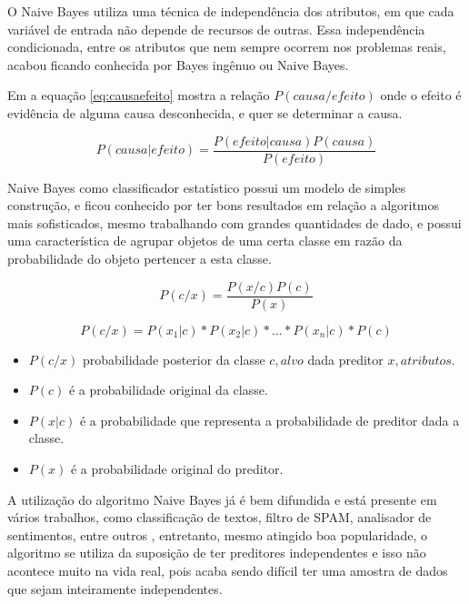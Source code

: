O Naive Bayes utiliza uma técnica de independência dos atributos, em que cada variável de entrada não depende de recursos de outras. Essa independência condicionada, entre os atributos que nem sempre ocorrem nos problemas reais, acabou ficando conhecida por Bayes ingênuo ou Naive Bayes. 

Em \cite{RusselStuart.Norvig2013} a equação \ref{eq:causaefeito} mostra a relação ${P(causa/efeito)}$ onde o efeito é evidência de alguma causa desconhecida, e quer se determinar a causa.

\begin{equation} \label{eq:causaefeito}
 P(causa|efeito)= \frac{P(efeito|causa)P(causa)}{P(efeito)}
\end{equation}

Naive Bayes como classificador estatístico possui um modelo de simples construção, e ficou conhecido por ter bons resultados em relação a algoritmos mais sofisticados, mesmo trabalhando com grandes quantidades de dado, e possui uma característica de agrupar objetos de uma certa classe em razão da probabilidade do objeto pertencer a esta classe. 

\begin{equation}
 P(c/x)= \frac{P(x/c)P(c)}{P(x)}
\end{equation}

\begin{equation}
 P(c/x)=P(x_1|c)*P(x_2|c)*...*P(x_n|c)*P(c)
 \label{eq:bayes}
\end{equation}


\begin{itemize}
 \item ${P(c/x)}$ probabilidade posterior da classe ${c,alvo}$ dada preditor ${x,atributos}$.
 \item ${P(c)}$  é a probabilidade original da classe.
 \item ${P(x|c)}$  é a probabilidade que representa a probabilidade de preditor dada a classe.
 \item ${P(x)}$  é a probabilidade original do preditor.
\end{itemize}

A utilização do algoritmo Naive Bayes já é bem difundida e está presente em vários trabalhos, como classificação de textos, filtro de SPAM, analisador de sentimentos, entre outros \cite{Madureira2017, Lucca2013, Wu2008, Mccallum1997}, entretanto, mesmo atingido boa popularidade, o algoritmo se utiliza da suposição de ter preditores independentes e isso não acontece muito na vida real, pois acaba sendo difícil ter uma amostra de dados que sejam inteiramente independentes. 

